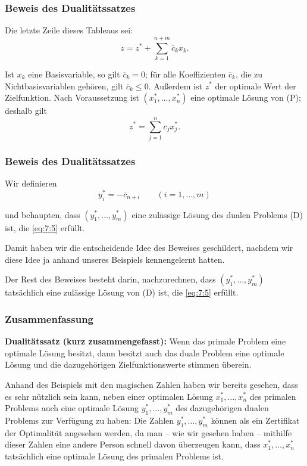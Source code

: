 \documentclass[smaller]{beamer}
\begin{document}
\begin{frame}
\frametitle{Beweis des Dualitätssatzes}
 Die letzte Zeile dieses Tableaus sei:
\begin{equation}
\label{eq:7:7}
z = z^* + \sum\limits_{k=1}^{n+m}{\overline{c}_kx_k}.
\end{equation}

Ist $x_k$ eine Basisvariable, so gilt $\overline{c}_k=0$; für alle Koeffizienten $\overline{c}_k$, die zu Nichtbasisvariablen gehören, gilt $\overline{c}_k \leq 0$. Außerdem ist $z^*$ der optimale Wert der Zielfunktion. Nach Voraussetzung ist $(x_1^*, \ldots, x_n^*)$ eine optimale Lösung von (P); deshalb gilt
\begin{equation}
\label{eq:7:8}
z^* = \sum\limits_{j=1}^{n}{c_jx_j^*}.
\end{equation}
\end{frame}

\begin{frame}
\frametitle{Beweis des Dualitätssatzes}
Wir definieren
\begin{equation}
\label{eq:7:9}
y_i^* = -\overline{c}_{n+i} \qquad (i=1,\ldots,m)
\end{equation}

und behaupten, dass $(y_1^*,\ldots,y_m^*)$ eine zulässige Lösung des dualen Problems (D) ist, die \eqref{eq:7:5} erfüllt. \\ \vspace*{0.2cm}

\alert{Damit haben wir die entscheidende Idee des Beweises geschildert, nachdem wir diese Idee ja anhand unseres Beispiels kennengelernt hatten}. \\ \vspace*{0.2cm}

Der Rest des Beweises besteht darin, {\glqq}nachzurechnen{\grqq}, dass $(y_1^*,\ldots,y_m^*)$ tatsächlich eine zulässige Lösung von (D) ist, die \eqref{eq:7:5} erfüllt.
\end{frame}

\begin{frame}
\frametitle{Zusammenfassung}
\textbf{Dualitätssatz (kurz zusammengefasst):}
Wenn das primale Problem eine optimale Lösung besitzt, dann besitzt auch das duale Problem eine optimale Lösung \alert{und die dazugehörigen Zielfunktionswerte stimmen überein}. \\ \vspace*{0.2cm}

Anhand des Beispiels mit den {\glqq}magischen Zahlen{\grqq} haben wir bereits gesehen, dass es sehr nützlich sein kann, neben einer optimalen Lösung $x_1^*,\ldots, x_n^*$ des primalen Problems auch eine optimale Lösung $y_1^*,\ldots,y_m^*$ des dazugehörigen dualen Problems zur Verfügung zu haben: Die Zahlen $y_1^*,\ldots,y_m^*$ können als ein \alert{Zertifikat der Optimalität} angesehen werden, da man -- wie wir gesehen haben -- mithilfe dieser Zahlen eine andere Person schnell davon überzeugen kann, dass $x_1^*,\ldots,x_n^*$ tatsächlich eine optimale Lösung des primalen Problems ist.
\end{frame}
\end{document}
